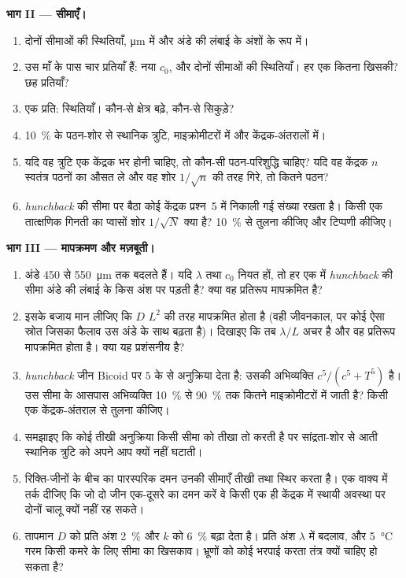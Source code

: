 \begin{problem}
\medskip
\noindent\textbf{भाग II --- सीमाएँ।}
\begin{enumerate}[resume]
  \item दोनों सीमाओं की स्थितियाँ, \unit{\micro m} में और अंडे की
        लंबाई के अंशों के रूप में।
  \item उस माँ के पास चार प्रतियाँ हैं: नया $c_{0}$, और दोनों सीमाओं की
        स्थितियाँ। हर एक कितना खिसकी? छह प्रतियाँ?
  \item एक प्रति: स्थितियाँ। कौन-से क्षेत्र बढ़े, कौन-से सिकुड़े?
  \item \qty{10}{\%} के पठन-शोर से स्थानिक त्रुटि, माइक्रोमीटरों में
        और केंद्रक-अंतरालों में।
  \item यदि वह त्रुटि एक केंद्रक भर होनी चाहिए, तो कौन-सी पठन-परिशुद्धि
        चाहिए? यदि वह केंद्रक $n$ स्वतंत्र पठनों का औसत ले और वह शोर
        $1/\sqrt{n}$ की तरह गिरे, तो कितने पठन?
  \item \emph{hunchback} की सीमा पर बैठा कोई केंद्रक प्रश्न~5 में
        निकाली गई संख्या रखता है। किसी एक तात्क्षणिक गिनती का प्वासों
        शोर $1/\sqrt{N}$ क्या है? \qty{10}{\%} से तुलना कीजिए और
        टिप्पणी कीजिए।
\end{enumerate}

\medskip
\noindent\textbf{भाग III --- मापक्रमण और मज़बूती।}
\begin{enumerate}[resume]
  \item अंडे \qty{450}{} से \qty{550}{\micro m} तक बदलते हैं। यदि
        $\lambda$ तथा $c_{0}$ नियत हों, तो हर एक में
        \emph{hunchback} की सीमा अंडे की लंबाई के किस अंश पर पड़ती है?
        क्या वह प्रतिरूप मापक्रमित है?
  \item इसके बजाय मान लीजिए कि $D$ $L^{2}$ की तरह मापक्रमित होता है
        (वही जीवनकाल, पर कोई ऐसा स्रोत जिसका फैलाव उस अंडे के साथ
        बढ़ता है)। दिखाइए कि तब $\lambda/L$ अचर है और वह प्रतिरूप
        मापक्रमित होता है। क्या यह प्रशंसनीय है?
  \item \emph{hunchback} जीन Bicoid पर $5$ के  से अनुक्रिया
        देता है: उसकी अभिव्यक्ति $c^{5}/(c^{5} + T^{5})$ है। उस सीमा
        के आसपास अभिव्यक्ति \qty{10}{\%} से \qty{90}{\%} तक कितने
        माइक्रोमीटरों में जाती है? किसी एक केंद्रक-अंतराल से तुलना
        कीजिए।
  \item समझाइए कि कोई तीखी अनुक्रिया किसी सीमा को तीखा तो करती है पर
        सांद्रता-शोर से आती स्थानिक त्रुटि को अपने आप क्यों नहीं घटाती।
  \item रिक्ति-जीनों के बीच का पारस्परिक दमन उनकी सीमाएँ तीखी तथा
        स्थिर करता है। एक वाक्य में तर्क दीजिए कि जो दो जीन एक-दूसरे का
        दमन करें वे किसी एक ही केंद्रक में स्थायी अवस्था पर दोनों चालू
        क्यों नहीं रह सकते।
  \item तापमान $D$ को प्रति अंश \qty{2}{\%} और $k$ को \qty{6}{\%}
        बढ़ा देता है। प्रति अंश $\lambda$ में बदलाव, और
        \qty{5}{\celsius} गरम किसी कमरे के लिए सीमा का खिसकाव। भ्रूणों
        को कोई भरपाई करता तंत्र क्यों चाहिए हो सकता है?
\end{enumerate}


\end{problem}
